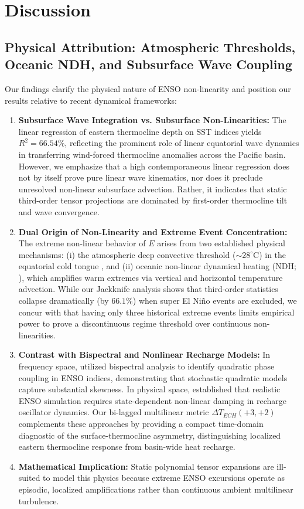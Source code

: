 \documentclass[11pt,a4paper]{article}
\begin{document}
\section{Discussion}

\subsection{Physical Attribution: Atmospheric Thresholds, Oceanic NDH, and Subsurface Wave Coupling}
Our findings clarify the physical nature of ENSO non-linearity and position our results relative to recent dynamical frameworks:
\begin{enumerate}
    \item \textbf{Subsurface Wave Integration vs. Subsurface Non-Linearities:} The linear regression of eastern thermocline depth on SST indices yields $R^2 = 66.54\%$, reflecting the prominent role of linear equatorial wave dynamics in transferring wind-forced thermocline anomalies across the Pacific basin. However, we emphasize that a high contemporaneous linear regression does not by itself prove pure linear wave kinematics, nor does it preclude unresolved non-linear subsurface advection. Rather, it indicates that static third-order tensor projections are dominated by first-order thermocline tilt and wave convergence.
    \item \textbf{Dual Origin of Non-Linearity and Extreme Event Concentration:} The extreme non-linear behavior of $E$ arises from two established physical mechanisms: (i) the atmospheric deep convective threshold ($\sim 28^\circ$C) in the equatorial cold tongue \citep{takahashi2016strong, takahashi2019theoretical, capotondi2020diversity}, and (ii) oceanic non-linear dynamical heating (NDH; \citealt{an2004nonlinearity}), which amplifies warm extremes via vertical and horizontal temperature advection. While our Jackknife analysis shows that third-order statistics collapse dramatically (by $66.1\%$) when super El Ni\~no events are excluded, we concur with \citet{takahashi2019theoretical} that having only three historical extreme events limits empirical power to prove a discontinuous regime threshold over continuous non-linearities.
    \item \textbf{Contrast with Bispectral and Nonlinear Recharge Models:} In frequency space, \citet{pires2021bispectral} utilized bispectral analysis to identify quadratic phase coupling in ENSO indices, demonstrating that stochastic quadratic models capture substantial skewness. In physical space, \citet{han2026realistic} established that realistic ENSO simulation requires state-dependent non-linear damping in recharge oscillator dynamics. Our bi-lagged multilinear metric $\Delta T_{ECH}(+3, +2)$ complements these approaches by providing a compact time-domain diagnostic of the surface-thermocline asymmetry, distinguishing localized eastern thermocline response from basin-wide heat recharge.
    \item \textbf{Mathematical Implication:} Static polynomial tensor expansions are ill-suited to model this physics because extreme ENSO excursions operate as episodic, localized amplifications rather than continuous ambient multilinear turbulence.
\end{enumerate}
\end{document}
